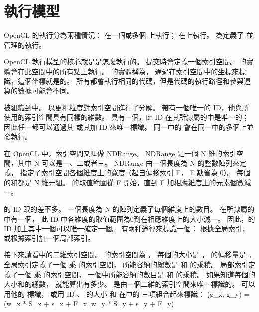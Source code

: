 
\section{執行模型}
OpenCL 的執行分為兩種情況：
在一個或多個 {} 上執行；
在上執行。
為定義了
並管理的執行。

OpenCL 執行模型的核心就是是怎麼執行的。
提交時會定義一個索引空間。
的實體會在此空間中的所有點上執行。
的實體稱為，
通過在索引空間中的坐標來標識，這個坐標就是的。
所有都會執行相同的代碼，但是代碼的執行路徑和參與運算的數據可能會不同。

被組織到中。
以更粗粒度對索引空間進行了分解。
帶有一個唯一的 ID，他與所使用的索引空間具有同樣的維數。
具有一個，此 ID 在其所隸屬的中是唯一的；
因此任一都可以通過其
或其加 ID 來唯一標識。
同一中的
會在同一中的多個上並發執行。

在 OpenCL 中，索引空間又叫做 NDRange。
 NDRange 是一個 N 維的索引空間，其中 N 可以是一、二或者三。
 NDRange 由一個長度為 N 的整數陣列來定義，
指定了索引空間各個維度上的寬度（起自偏移索引 F， F 缺省為 0）。
每個的和都是 N 維元組。
的取值範圍從 F 開始，直到 F 加相應維度上的元素個數減一。

的 ID 跟的差不多。
一個長度為 N 的陣列定義了每個維度上的數目。
在所隸屬的中有一個，
此 ID 中各維度的取值範圍為0到在相應維度上的大小減一。
因此，的 ID 加上其中一個可以唯一確定一個。
有兩種途徑來標識一個：
根據全局索引，或根據索引加一個局部索引。

接下來請看中的二維索引空間。
的索引空間為 ，
每個的大小是 ，
的偏移量是 。
全局索引定義了一個  乘  的索引空間，
所能容納的總數是  和  的乘積。
局部索引定義了一個  乘  的索引空間，
一個中所能容納的數目是  和  的乘積。
如果知道每個的大小和的總數，
就能算出有多少。
是由一個二維的索引空間來唯一標識的。
可以用他的  標識，
或用 ID 、
的大小  和
在中的  三項組合起來標識：
\startformula
(g_x, g_y) = (w_x * S_x + s_x + F_x, w_y * S_y + s_y + F_y)
\stopformula

